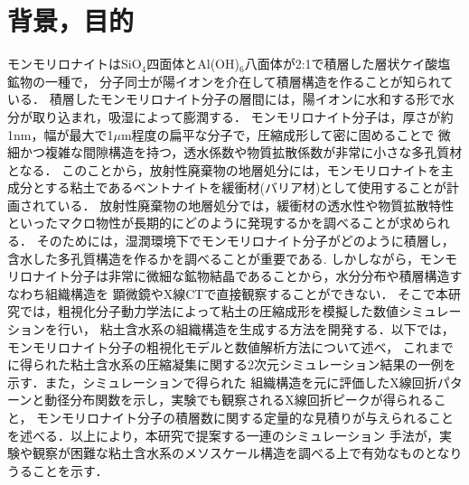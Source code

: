﻿\documentclass[11pt,a4j]{jarticle}
\begin{document}
\section{背景，目的}
モンモリロナイトはSiO$_4$四面体とAl(OH)$_6$八面体が2:1で積層した層状ケイ酸塩鉱物の一種で，
分子同士が陽イオンを介在して積層構造を作ることが知られている．
積層したモンモリロナイト分子の層間には，陽イオンに水和する形で水分が取り込まれ，吸湿によって膨潤する．
モンモリロナイト分子は，厚さが約1nm，幅が最大で1$\mu$m程度の扁平な分子で，圧縮成形して密に固めることで
微細かつ複雑な間隙構造を持つ，透水係数や物質拡散係数が非常に小さな多孔質材となる．
このことから，放射性廃棄物の地層処分には，モンモリロナイトを主成分とする粘土であるベントナイトを緩衝材(バリア材)として使用することが計画されている．
放射性廃棄物の地層処分では，緩衝材の透水性や物質拡散特性といったマクロ物性が長期的にどのように発現するかを調べることが求められる．
そのためには，湿潤環境下でモンモリロナイト分子がどのように積層し，含水した多孔質構造を作るかを調べることが重要である.
しかしながら，モンモリロナイト分子は非常に微細な鉱物結晶であることから，水分分布や積層構造すなわち組織構造を
顕微鏡やX線CTで直接観察することができない．
そこで本研究では，粗視化分子動力学法によって粘土の圧縮成形を模擬した数値シミュレーションを行い，
粘土含水系の組織構造を生成する方法を開発する．以下では，モンモリロナイト分子の粗視化モデルと数値解析方法について述べ，
これまでに得られた粘土含水系の圧縮凝集に関する2次元シミュレーション結果の一例を示す．また，シミュレーションで得られた
組織構造を元に評価したX線回折パターンと動径分布関数を示し，実験でも観察されるX線回折ピークが得られること，
モンモリロナイト分子の積層数に関する定量的な見積りが与えられることを述べる．以上により，本研究で提案する一連のシミュレーション
手法が，実験や観察が困難な粘土含水系のメソスケール構造を調べる上で有効なものとなりうることを示す．
\end{document}
